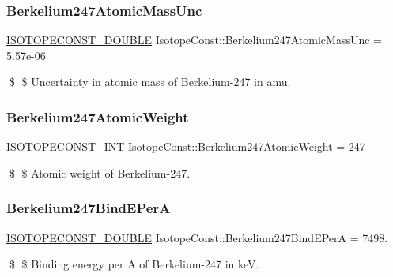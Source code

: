 \subsubsection{\texorpdfstring{Berkelium247\+Atomic\+Mass\+Unc}{Berkelium247AtomicMassUnc}}
{\footnotesize\ttfamily \mbox{\hyperlink{group___isotope_const-_macros_ga8f45a7272ce02c0b4c65c44636ed719a}{I\+S\+O\+T\+O\+P\+E\+C\+O\+N\+S\+T\+\_\+\+D\+O\+U\+B\+LE}} Isotope\+Const\+::\+Berkelium247\+Atomic\+Mass\+Unc = 5.\+57e-\/06}

\$ \$ Uncertainty in atomic mass of Berkelium-\/247 in amu. \mbox{\label{group___isotope_const-_berkelium-_bk247_ga1c449482bb3133f6a320011898959978}} 
\subsubsection{\texorpdfstring{Berkelium247\+Atomic\+Weight}{Berkelium247AtomicWeight}}
{\footnotesize\ttfamily \mbox{\hyperlink{group___isotope_const-_macros_ga5f18360b3e99483a35c32d789e62621c}{I\+S\+O\+T\+O\+P\+E\+C\+O\+N\+S\+T\+\_\+\+I\+NT}} Isotope\+Const\+::\+Berkelium247\+Atomic\+Weight = 247}

\$ \$ Atomic weight of Berkelium-\/247. \mbox{\label{group___isotope_const-_berkelium-_bk247_gaa6b13ca91b140bfcf9e5a4d6e40f1d0f}} 
\subsubsection{\texorpdfstring{Berkelium247\+Bind\+E\+PerA}{Berkelium247BindEPerA}}
{\footnotesize\ttfamily \mbox{\hyperlink{group___isotope_const-_macros_ga8f45a7272ce02c0b4c65c44636ed719a}{I\+S\+O\+T\+O\+P\+E\+C\+O\+N\+S\+T\+\_\+\+D\+O\+U\+B\+LE}} Isotope\+Const\+::\+Berkelium247\+Bind\+E\+PerA = 7498.}

\$ \$ Binding energy per A of Berkelium-\/247 in keV. \mbox{\label{group___isotope_const-_berkelium-_bk247_ga978fc94efa3b76a180b3c0a46d021cc8}} 
